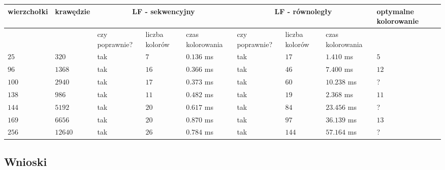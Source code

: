 \documentclass{article}
\begin{document}
	\begin{center}
	\hspace*{-1.5cm}	
	\begin{tabular}{|p{2cm}|p{1.7cm}|p{1.5cm}|p{1.5cm}|p{1.5cm}|p{1.5cm}|p{1.5cm}|p{1.5cm}|p{1.5cm}|} \hline
		\textbf{wierzchołki} & \textbf{krawędzie} & \multicolumn{3}{|c|}{\textbf{LF - sekwencyjny}} & \multicolumn{3}{|c|}{\textbf{LF - równoległy}} & optymalne kolorowanie \\
		\hline
		 & & czy poprawnie? & liczba kolorów & czas kolorowania & czy poprawnie? & liczba kolorów & czas kolorowania & \\
		 \hline
		 $25$ & $320$ & tak & $7$ & $0.136$ ms & tak & $17$ & $1.410$ ms & $5$ \\
		 \hline
		$96$ & $1368$ & tak & $16$ & $0.366$ ms & tak & $46$ & $7.400$ ms & $12$ \\
		 \hline
		 $100$ & $2940$ & tak & $17$ & $0.373$ ms & tak & $60$ & $10.238$ ms & ? \\
		 \hline
		 $138$ & $986$ & tak & $11$ & $0.482$ ms & tak & $19$ & $2.368$ ms & $11$ \\
		\hline
		$144$ & $5192$ & tak & $20$ & $0.617$ ms & tak & $84$ & $23.456$ ms & ? \\
		\hline	
		$169$ & $6656$ & tak & $20$ & $0.870$ ms & tak & $97$ & $36.139$ ms & $13$ \\	 
		\hline		
		$256$ & $12640$ & tak & $26$ & $0.784$ ms & tak & $144$ & $57.164$ ms & ? \\
		\hline
	\end{tabular}
	\end{center}
		
	\subsection{Wnioski}
	
\end{document}
